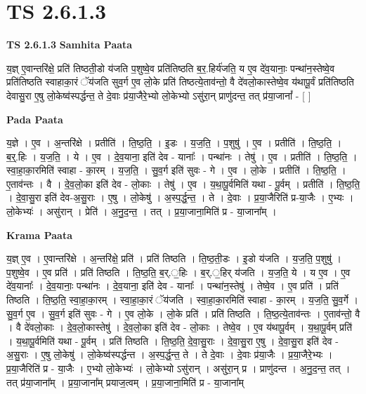 \documentclass[17pt]{extarticle}
\begin{document}
\section*{ TS 2.6.1.3 }

\textbf{TS 2.6.1.3 } \newline
\textbf{Samhita Paata} \newline

य॒ज्ञ् ए॒वान्तरि॑क्षे॒ प्रति॑ तिष्ठती॒डो य॑जति प॒शुष्वे॒व प्रति॑तिष्ठति ब॒र॒.हिर्य॑जति॒ य ए॒व दे॑व॒यानाः॒ पन्था॑न॒स्तेष्वे॒व प्रति॑तिष्ठति स्वाहाका॒रं ॅय॑जति सुव॒र्ग ए॒व लो॒के प्रति॑ तिष्ठत्ये॒ताव॑न्तो॒ वै दे॑वलो॒कास्तेष्वे॒व य॑थापू॒र्वं प्रति॑तिष्ठति देवासु॒रा ए॒षु लो॒केष्व॑स्पर्द्धन्त॒ ते दे॒वाः प्र॑या॒जैरे॒भ्यो लो॒केभ्यो ऽसु॑रा॒न् प्राणु॑दन्त॒ तत् प्र॑या॒जानां᳚ - [  ] \newline

\textbf{Pada Paata} \newline

य॒ज्ञे । ए॒व । अ॒न्तरि॑क्षे । प्रतीति॑ । ति॒ष्ठ॒ति॒ । इ॒डः । य॒ज॒ति॒ । प॒शुषु॑ । ए॒व । प्रतीति॑ । ति॒ष्ठ॒ति॒ । ब॒र्॒.हिः । य॒ज॒ति॒ । ये । ए॒व । दे॒व॒याना॒ इति॑ देव - यानाः᳚ । पन्था॑नः । तेषु॑ । ए॒व । प्रतीति॑ । ति॒ष्ठ॒ति॒ । स्वा॒हा॒का॒रमिति॑ स्वाहा - का॒रम् । य॒ज॒ति॒ । सु॒व॒र्ग इति॑ सुवः - गे । ए॒व । लो॒के । प्रतीति॑ । ति॒ष्ठ॒ति॒ । ए॒ताव॑न्तः । वै । दे॒व॒लो॒का इति॑ देव - लो॒काः । तेषु॑ । ए॒व । य॒था॒पू॒र्वमिति॑ यथा - पू॒र्वम् । प्रतीति॑ । ति॒ष्ठ॒ति॒ । दे॒वा॒सु॒रा इति॑ देव-अ॒सु॒राः । ए॒षु । लो॒केषु॑ । अ॒स्प॒र्द्ध॒न्त॒ । ते । दे॒वाः । प्र॒या॒जैरिति॑ प्र-या॒जैः । ए॒भ्यः । लो॒केभ्यः॑ । असु॑रान् । प्रेति॑ । अ॒नु॒द॒न्त॒ । तत् । प्र॒या॒जाना॒मिति॑ प्र - या॒जाना᳚म् ।  \newline


\textbf{Krama Paata} \newline

य॒ज्ञ् ए॒व । ए॒वान्तरि॑क्षे । अ॒न्तरि॑क्षे॒ प्रति॑ । प्रति॑ तिष्ठति । ति॒ष्ठ॒ती॒डः । इ॒डो य॑जति । य॒ज॒ति॒ प॒शुषु॑ । प॒शुष्वे॒व । ए॒व प्रति॑ । प्रति॑ तिष्ठति । ति॒ष्ठ॒ति॒ ब॒र्.॒हिः । ब॒र्.॒हिर् य॑जति । य॒ज॒ति॒ ये । य ए॒व । ए॒व दे॑व॒यानाः᳚ । दे॒व॒यानाः॒ पन्था॑नः । दे॒व॒याना॒ इति॑ देव - यानाः᳚ । पन्था॑न॒स्तेषु॑ । तेष्वे॒व । ए॒व प्रति॑ । प्रति॑ तिष्ठति । ति॒ष्ठ॒ति॒ स्वा॒हा॒का॒रम् । स्वा॒हा॒का॒रं ॅय॑जति । स्वा॒हा॒का॒रमिति॑ स्वाहा - का॒रम् । य॒ज॒ति॒ सु॒व॒र्गे । सु॒व॒र्ग ए॒व । सु॒व॒र्ग इति॑ सुवः - गे । ए॒व लो॒के । लो॒के प्रति॑ । प्रति॑ तिष्ठति । ति॒ष्ठ॒त्ये॒ताव॑न्तः । ए॒ताव॑न्तो॒ वै । वै दे॑वलो॒काः । दे॒व॒लो॒कास्तेषु॑ । दे॒व॒लो॒का इति॑ देव - लो॒काः । तेष्वे॒व । ए॒व य॑थापू॒र्वम् । य॒था॒पू॒र्वम् प्रति॑ । य॒था॒पू॒र्वमिति॑ यथा - पू॒र्वम् । प्रति॑ तिष्ठति । ति॒ष्ठ॒ति॒ दे॒वा॒सु॒राः । दे॒वा॒सु॒रा ए॒षु । दे॒वा॒सु॒रा इति॑ देव - अ॒सु॒राः । ए॒षु लो॒केषु॑ । लो॒केष्व॑स्पर्द्धन्त । अ॒स्प॒र्द्ध॒न्त॒ ते । ते दे॒वाः । दे॒वाः प्र॑या॒जैः । प्र॒या॒जैरे॒भ्यः । प्र॒या॒जैरिति॑ प्र - या॒जैः । ए॒भ्यो लो॒केभ्यः॑ । लो॒केभ्यो ऽसु॑रान् । असु॑रा॒न् प्र । प्राणु॑दन्त । अ॒नु॒द॒न्त॒ तत् । तत् प्र॑या॒जाना᳚म् । प्र॒या॒जाना᳚म् प्रयाज॒त्वम् । प्र॒या॒जाना॒मिति॑ प्र - या॒जाना᳚म् \newline
\end{document}
